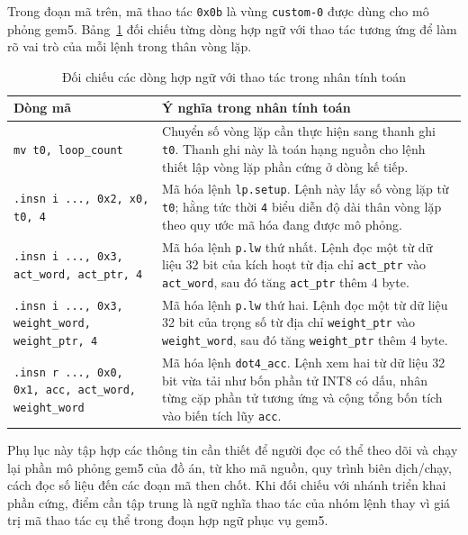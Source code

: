 \documentclass[../DoAn.tex]{subfiles}
\begin{document}
Trong đoạn mã trên, mã thao tác \texttt{0x0b} là vùng \texttt{custom-0} được dùng cho mô phỏng gem5. Bảng~\ref{tab:phuluc-gem5-asm-map} đối chiếu từng dòng hợp ngữ với thao tác tương ứng để làm rõ vai trò của mỗi lệnh trong thân vòng lặp.

\begin{table}[H]
    \centering
    \small
    \renewcommand{\arraystretch}{1.16}
    \begin{tabular}{|>{\raggedright\arraybackslash}p{4.45cm}|>{\raggedright\arraybackslash}p{8.45cm}|}
        \hline
        \textbf{Dòng mã} & \textbf{Ý nghĩa trong nhân tính toán} \\
        \hline
        \texttt{mv t0, loop\_count} & Chuyển số vòng lặp cần thực hiện sang thanh ghi \texttt{t0}. Thanh ghi này là toán hạng nguồn cho lệnh thiết lập vòng lặp phần cứng ở dòng kế tiếp. \\
        \hline
        \texttt{.insn i ..., 0x2, x0, t0, 4} & Mã hóa lệnh \texttt{lp.setup}. Lệnh này lấy số vòng lặp từ \texttt{t0}; hằng tức thời \texttt{4} biểu diễn độ dài thân vòng lặp theo quy ước mã hóa đang được mô phỏng. \\
        \hline
        \texttt{.insn i ..., 0x3, act\_word, act\_ptr, 4} & Mã hóa lệnh \texttt{p.lw} thứ nhất. Lệnh đọc một từ dữ liệu 32 bit của kích hoạt từ địa chỉ \texttt{act\_ptr} vào \texttt{act\_word}, sau đó tăng \texttt{act\_ptr} thêm 4 byte. \\
        \hline
        \texttt{.insn i ..., 0x3, weight\_word, weight\_ptr, 4} & Mã hóa lệnh \texttt{p.lw} thứ hai. Lệnh đọc một từ dữ liệu 32 bit của trọng số từ địa chỉ \texttt{weight\_ptr} vào \texttt{weight\_word}, sau đó tăng \texttt{weight\_ptr} thêm 4 byte. \\
        \hline
        \texttt{.insn r ..., 0x0, 0x1, acc, act\_word, weight\_word} & Mã hóa lệnh \texttt{dot4\_acc}. Lệnh xem hai từ dữ liệu 32 bit vừa tải như bốn phần tử INT8 có dấu, nhân từng cặp phần tử tương ứng và cộng tổng bốn tích vào biến tích lũy \texttt{acc}. \\
        \hline
    \end{tabular}
    \caption{Đối chiếu các dòng hợp ngữ với thao tác trong nhân tính toán}
    \label{tab:phuluc-gem5-asm-map}
\end{table}

Phụ lục này tập hợp các thông tin cần thiết để người đọc có thể theo dõi và chạy lại phần mô phỏng gem5 của đồ án, từ kho mã nguồn, quy trình biên dịch/chạy, cách đọc số liệu đến các đoạn mã then chốt. Khi đối chiếu với nhánh triển khai phần cứng, điểm cần tập trung là ngữ nghĩa thao tác của nhóm lệnh thay vì giá trị mã thao tác cụ thể trong đoạn hợp ngữ phục vụ gem5.
\end{document}
